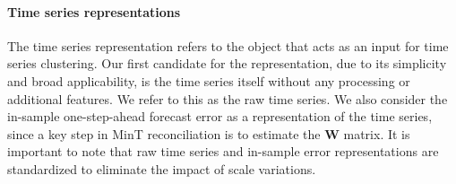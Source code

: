 \documentclass[a4paper,review,12pt,authoryear]{elsarticle}
\begin{document}

\paragraph{\textbf{Time series representations}}


The time series representation refers to the object that acts as an input for time series clustering. %
{\color{purple} Our first candidate for the representation, due to its simplicity and broad applicability, is the time series itself without any processing or additional features. We refer to this as the raw time series.}
We also consider the in-sample one-step-ahead forecast error as a representation of the time series, since a key step in MinT reconciliation is to estimate the $\boldsymbol{W}$ matrix. %
It is important to note that raw time series and in-sample error representations are standardized to eliminate the impact of scale variations. %
\end{document}
